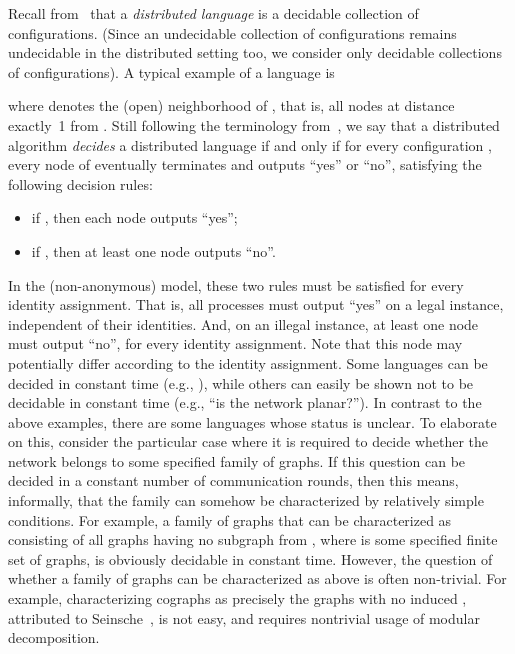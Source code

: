 \documentclass{llncs}
\begin{document}
Recall from~\cite{FKP11} that a {\em distributed language} is a decidable collection  of configurations. (Since an undecidable collection of configurations remains undecidable in the distributed setting too, we consider only decidable collections of configurations). A typical example of a language is 

where  denotes the (open) neighborhood of , that is, all nodes at distance exactly~1 from . Still following the terminology from~\cite{FKP11}, we say that a distributed algorithm  \emph{decides} a distributed language  if and only if for every configuration , every node of  eventually terminates and outputs ``yes'' or ``no'', satisfying the following decision rules: 
\begin{itemize}
\item 
if , then each node outputs ``yes'';
\item 
if , then at least one node outputs ``no''.
\end{itemize}
In the (non-anonymous)  model, these two rules must be satisfied for every identity assignment. That is, all processes must output ``yes'' on a legal instance, independent of their identities. And, on an illegal instance, at least one node must output ``no'', for every identity assignment. Note that this node may potentially differ according to the identity assignment. Some languages can be decided in constant time  (e.g., ), while others can easily be shown not to be decidable in constant time (e.g., ``is  the network planar?''). In contrast to the above examples, there are some languages whose status is unclear. To elaborate on this, consider the particular case where it is required to decide whether the network belongs to some specified family  of graphs. If this question can be decided in a constant number of communication rounds, then this means, informally, that the family  can somehow be characterized by relatively simple conditions. For example, a family  of graphs that can be characterized as consisting of all graphs having no subgraph from , where  is some specified finite set of graphs, is obviously decidable in constant time. However, the question of whether a family of graphs can be characterized as above is often non-trivial. For example, characterizing cographs as precisely the graphs with no induced , attributed to Seinsche~\cite{Seinsche74}, is not easy, and requires nontrivial usage of modular decomposition.
\end{document}
